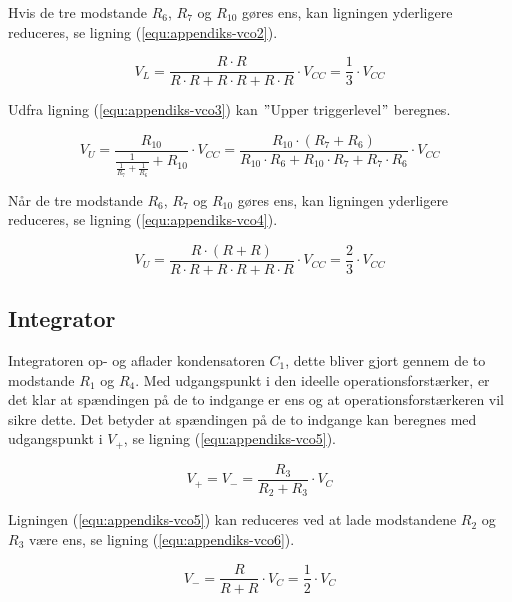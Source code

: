 Hvis de tre modstande $R_6$, $R_7$ og $R_{10}$ gøres ens, kan ligningen yderligere reduceres, se ligning (\ref{equ:appendiks-vco2}).

\begin{equation}
\label{equ:appendiks-vco2}
V_L = \frac{R \cdot R}{R \cdot R + R \cdot R + R \cdot R} \cdot V_{CC} = \frac{1}{3} \cdot V_{CC}
\end{equation}

Udfra ligning (\ref{equ:appendiks-vco3}) kan $"$Upper triggerlevel$"$ beregnes.

\begin{equation}
\label{equ:appendiks-vco3}
V_U = \frac{R_{10}}{\frac{1}{\frac{1}{R_7} + \frac{1}{R_6}} + R_{10}} \cdot V_{CC} = \frac{R_{10} \cdot (R_7 + R_6)}{R_{10} \cdot R_6 + R_{10} \cdot R_7 + R_7 \cdot R_6} \cdot V_{CC}
\end{equation}

Når de tre modstande $R_6$, $R_7$ og $R_{10}$ gøres ens, kan ligningen yderligere reduceres, se ligning (\ref{equ:appendiks-vco4}).

\begin{equation}
\label{equ:appendiks-vco4}
V_U = \frac{R \cdot (R + R)}{R \cdot R + R \cdot R + R \cdot R} \cdot V_{CC} = \frac{2}{3} \cdot V_{CC}
\end{equation}

\subsection*{Integrator}
Integratoren op- og aflader kondensatoren $C_1$, dette bliver gjort gennem de to modstande $R_1$ og $R_4$. Med udgangspunkt i den ideelle operationsforstærker, er det klar at spændingen på de to indgange er ens og at operationsforstærkeren vil sikre dette. Det betyder at spændingen på de to indgange kan beregnes med udgangspunkt i $V_+$, se ligning (\ref{equ:appendiks-vco5}).

\begin{equation}
\label{equ:appendiks-vco5}
V_+ = V_- = \frac{R_3}{R_2 + R_3} \cdot V_C
\end{equation}

Ligningen (\ref{equ:appendiks-vco5}) kan reduceres ved at lade modstandene $R_2$ og $R_3$ være ens, se ligning (\ref{equ:appendiks-vco6}).

\begin{equation}
\label{equ:appendiks-vco6}
V_- = \frac{R}{R + R} \cdot V_C = \frac{1}{2} \cdot V_C
\end{equation}


